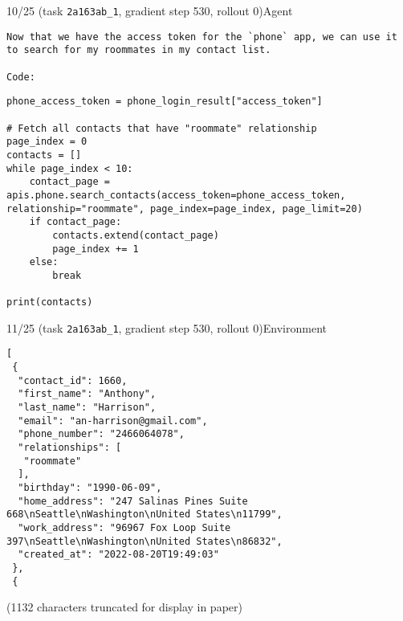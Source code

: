 \begin{minipage}{0.95\linewidth}
\begin{assistant_message_box}{{10/25 (task \texttt{2a163ab\_1}, gradient step 530, rollout 0)\hfill Agent}}
\scriptsize
\begin{Verbatim}[breaklines]
Now that we have the access token for the `phone` app, we can use it to search for my roommates in my contact list.

Code:
\end{Verbatim}
\begin{tcolorbox}[colback=codebgcolor,boxrule=0pt]\begin{Verbatim}[breaklines]
phone_access_token = phone_login_result["access_token"]

# Fetch all contacts that have "roommate" relationship
page_index = 0
contacts = []
while page_index < 10:
    contact_page = apis.phone.search_contacts(access_token=phone_access_token, relationship="roommate", page_index=page_index, page_limit=20)
    if contact_page:
        contacts.extend(contact_page)
        page_index += 1
    else:
        break

print(contacts)
\end{Verbatim}
\end{tcolorbox}\end{assistant_message_box}
\end{minipage}

\hspace*{8mm}%
\begin{minipage}{0.95\linewidth}
\begin{user_message_box}{{11/25 (task \texttt{2a163ab\_1}, gradient step 530, rollout 0)\hfill Environment}}
\scriptsize
\begin{Verbatim}[breaklines]
[
 {
  "contact_id": 1660,
  "first_name": "Anthony",
  "last_name": "Harrison",
  "email": "an-harrison@gmail.com",
  "phone_number": "2466064078",
  "relationships": [
   "roommate"
  ],
  "birthday": "1990-06-09",
  "home_address": "247 Salinas Pines Suite 668\nSeattle\nWashington\nUnited States\n11799",
  "work_address": "96967 Fox Loop Suite 397\nSeattle\nWashington\nUnited States\n86832",
  "created_at": "2022-08-20T19:49:03"
 },
 {
\end{Verbatim}
(1132 characters truncated for display in paper)\end{user_message_box}
\end{minipage}

